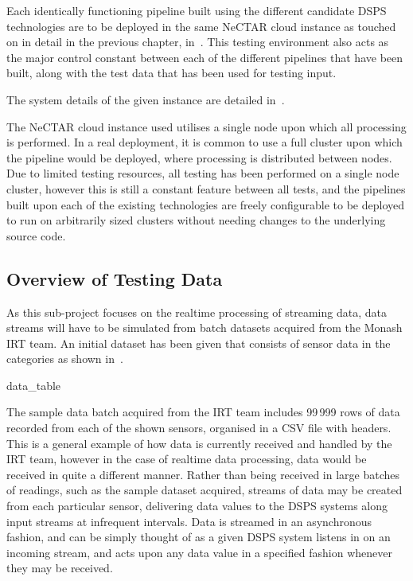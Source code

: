 Each identically functioning pipeline built using the different candidate DSPS technologies are to be deployed in the
same NeCTAR cloud instance as touched on in detail in the previous chapter, in~.
This testing environment also acts as the major control constant between each of the different pipelines that have been
built, along with the test data that has been used for testing input.

The system details of the given instance are detailed in~.

The NeCTAR cloud instance used utilises a single node upon which all processing is performed. In a real deployment, it is
common to use a full cluster upon which the pipeline would be deployed, where processing is distributed between nodes. Due to
limited testing resources, all testing
has been performed on a single node cluster, however this is still a constant feature between all tests, and the pipelines built upon
each of the existing technologies are freely configurable to be deployed to run on arbitrarily sized clusters without
needing changes to the underlying source code.



\subsection{Overview of Testing Data} %
\label{sub:overview_of_test_data}

As this sub-project focuses on the realtime processing of streaming data, data streams will have to be simulated from
batch datasets acquired from the Monash IRT team. An initial dataset has been given that consists of sensor data in the
categories as shown in~.

{data_table}

The sample data batch acquired from the IRT team includes 99\,999 rows of data recorded from each of the shown sensors,
organised in a CSV file with headers. This is a general example of how data is currently received and handled by the IRT
team, however in the case of realtime data processing, data would be received in quite a different manner. Rather than
being received in large batches of readings, such as the sample dataset acquired, streams of data may be created from
each particular sensor, delivering data values to the DSPS systems along input streams at infrequent intervals. Data
is streamed in an asynchronous fashion, and can be simply thought of as a given DSPS system listens in on an incoming stream, and
acts upon any data value in a specified fashion whenever they may be received.

